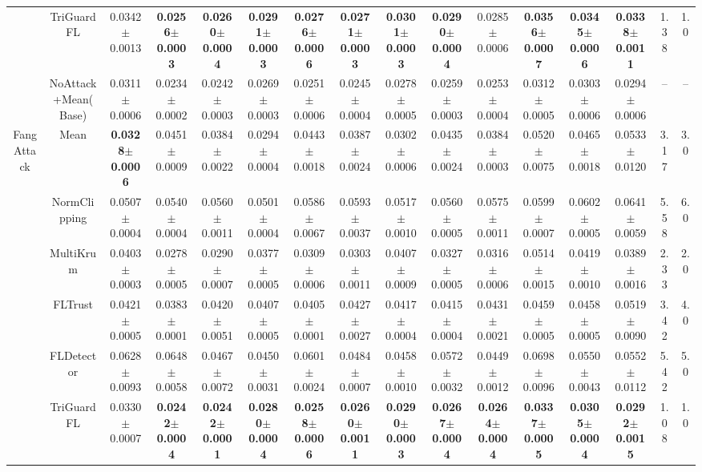 \begin{table}[t]
\begin{tabular}{c c c c c c c c c c c c c c c c}
 & \cellcolor{mygray}TriGuardFL & \cellcolor{mygray}0.0342$\pm$0.0013 & \cellcolor{mygray}\textbf{0.0256$\pm$0.0003} & \cellcolor{mygray}\textbf{0.0260$\pm$0.0004} & \cellcolor{mygray}\textbf{0.0291$\pm$0.0003} & \cellcolor{mygray}\textbf{0.0276$\pm$0.0006} & \cellcolor{mygray}\textbf{0.0271$\pm$0.0003} & \cellcolor{mygray}\textbf{0.0301$\pm$0.0003} & \cellcolor{mygray}\textbf{0.0290$\pm$0.0004} & \cellcolor{mygray}0.0285$\pm$0.0006 & \cellcolor{mygray}\textbf{0.0356$\pm$0.0007} & \cellcolor{mygray}\textbf{0.0345$\pm$0.0006} & \cellcolor{mygray}\textbf{0.0338$\pm$0.0011} & \cellcolor{mygray}1.38 & \cellcolor{mygray}1.0 \\
 & NoAttack+Mean(Base) & 0.0311$\pm$0.0006 & 0.0234$\pm$0.0002 & 0.0242$\pm$0.0003 & 0.0269$\pm$0.0003 & 0.0251$\pm$0.0006 & 0.0245$\pm$0.0004 & 0.0278$\pm$0.0005 & 0.0259$\pm$0.0003 & 0.0253$\pm$0.0004 & 0.0312$\pm$0.0005 & 0.0303$\pm$0.0006 & 0.0294$\pm$0.0006 & -- & -- \\
\midrule
\multirow{6}{*}{FangAttack} & Mean & \textbf{0.0328$\pm$0.0006} & 0.0451$\pm$0.0009 & 0.0384$\pm$0.0022 & 0.0294$\pm$0.0004 & 0.0443$\pm$0.0018 & 0.0387$\pm$0.0024 & 0.0302$\pm$0.0006 & 0.0435$\pm$0.0024 & 0.0384$\pm$0.0003 & 0.0520$\pm$0.0075 & 0.0465$\pm$0.0018 & 0.0533$\pm$0.0120 & 3.17 & 3.0 \\
 & NormClipping & 0.0507$\pm$0.0004 & 0.0540$\pm$0.0004 & 0.0560$\pm$0.0011 & 0.0501$\pm$0.0004 & 0.0586$\pm$0.0067 & 0.0593$\pm$0.0037 & 0.0517$\pm$0.0010 & 0.0560$\pm$0.0005 & 0.0575$\pm$0.0011 & 0.0599$\pm$0.0007 & 0.0602$\pm$0.0005 & 0.0641$\pm$0.0059 & 5.58 & 6.0 \\
 & MultiKrum & 0.0403$\pm$0.0003 & 0.0278$\pm$0.0005 & 0.0290$\pm$0.0007 & 0.0377$\pm$0.0005 & 0.0309$\pm$0.0006 & 0.0303$\pm$0.0011 & 0.0407$\pm$0.0009 & 0.0327$\pm$0.0005 & 0.0316$\pm$0.0006 & 0.0514$\pm$0.0015 & 0.0419$\pm$0.0010 & 0.0389$\pm$0.0016 & 2.33 & 2.0 \\
 & FLTrust & 0.0421$\pm$0.0005 & 0.0383$\pm$0.0001 & 0.0420$\pm$0.0051 & 0.0407$\pm$0.0005 & 0.0405$\pm$0.0001 & 0.0427$\pm$0.0027 & 0.0417$\pm$0.0004 & 0.0415$\pm$0.0004 & 0.0431$\pm$0.0021 & 0.0459$\pm$0.0005 & 0.0458$\pm$0.0005 & 0.0519$\pm$0.0090 & 3.42 & 4.0 \\
 & FLDetector & 0.0628$\pm$0.0093 & 0.0648$\pm$0.0058 & 0.0467$\pm$0.0072 & 0.0450$\pm$0.0031 & 0.0601$\pm$0.0024 & 0.0484$\pm$0.0007 & 0.0458$\pm$0.0010 & 0.0572$\pm$0.0032 & 0.0449$\pm$0.0012 & 0.0698$\pm$0.0096 & 0.0550$\pm$0.0043 & 0.0552$\pm$0.0112 & 5.42 & 5.0 \\
 & \cellcolor{mygray}TriGuardFL & \cellcolor{mygray}0.0330$\pm$0.0007 & \cellcolor{mygray}\textbf{0.0242$\pm$0.0004} & \cellcolor{mygray}\textbf{0.0242$\pm$0.0001} & \cellcolor{mygray}\textbf{0.0280$\pm$0.0004} & \cellcolor{mygray}\textbf{0.0258$\pm$0.0006} & \cellcolor{mygray}\textbf{0.0260$\pm$0.0011} & \cellcolor{mygray}\textbf{0.0290$\pm$0.0003} & \cellcolor{mygray}\textbf{0.0267$\pm$0.0004} & \cellcolor{mygray}\textbf{0.0264$\pm$0.0004} & \cellcolor{mygray}\textbf{0.0337$\pm$0.0005} & \cellcolor{mygray}\textbf{0.0305$\pm$0.0004} & \cellcolor{mygray}\textbf{0.0292$\pm$0.0015} & \cellcolor{mygray}1.08 & \cellcolor{mygray}1.0 \\

\end{tabular}
\end{table}
